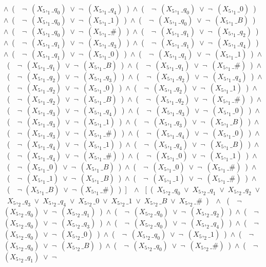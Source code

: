 ﻿\documentclass[a4paper,10pt]{article}
\begin{document}
$\wedge$\ (\ \ $\neg$\ $(X_5,_1\_q_0)$\ $\vee$\ $\neg$\ $(X_5,_1\_q_4)$\ )\ $\wedge$\ (\ \ $\neg$\ $(X_5,_1\_q_0)$\ $\vee$\ $\neg$\ $(X_5,_1\_0)$\ )\ $\wedge$\ (\ \ $\neg$\ $(X_5,_1\_q_0)$\ $\vee$\ $\neg$\ $(X_5,_1\_1)$\ )\ $\wedge$\ (\ \ $\neg$\ $(X_5,_1\_q_0)$\ $\vee$\ $\neg$\ $(X_5,_1\_B)$\ )\ $\wedge$\ (\ \ $\neg$\ $(X_5,_1\_q_0)$\ $\vee$\ $\neg$\ $(X_5,_1\_\#)$\ )\ $\wedge$\ (\ \ $\neg$\ $(X_5,_1\_q_1)$\ $\vee$\ $\neg$\ $(X_5,_1\_q_2)$\ )\ $\wedge$\ (\ \ $\neg$\ $(X_5,_1\_q_1)$\ $\vee$\ $\neg$\ $(X_5,_1\_q_3)$\ )\ $\wedge$\ (\ \ $\neg$\ $(X_5,_1\_q_1)$\ $\vee$\ $\neg$\ $(X_5,_1\_q_4)$\ )\ $\wedge$\ (\ \ $\neg$\ $(X_5,_1\_q_1)$\ $\vee$\ $\neg$\ $(X_5,_1\_0)$\ )\ $\wedge$\ (\ \ $\neg$\ $(X_5,_1\_q_1)$\ $\vee$\ $\neg$\ $(X_5,_1\_1)$\ )\ $\wedge$\ (\ \ $\neg$\ $(X_5,_1\_q_1)$\ $\vee$\ $\neg$\ $(X_5,_1\_B)$\ )\ $\wedge$\ (\ \ $\neg$\ $(X_5,_1\_q_1)$\ $\vee$\ $\neg$\ $(X_5,_1\_\#)$\ )\ $\wedge$\ (\ \ $\neg$\ $(X_5,_1\_q_2)$\ $\vee$\ $\neg$\ $(X_5,_1\_q_3)$\ )\ $\wedge$\ (\ \ $\neg$\ $(X_5,_1\_q_2)$\ $\vee$\ $\neg$\ $(X_5,_1\_q_4)$\ )\ $\wedge$\ (\ \ $\neg$\ $(X_5,_1\_q_2)$\ $\vee$\ $\neg$\ $(X_5,_1\_0)$\ )\ $\wedge$\ (\ \ $\neg$\ $(X_5,_1\_q_2)$\ $\vee$\ $\neg$\ $(X_5,_1\_1)$\ )\ $\wedge$\ (\ \ $\neg$\ $(X_5,_1\_q_2)$\ $\vee$\ $\neg$\ $(X_5,_1\_B)$\ )\ $\wedge$\ (\ \ $\neg$\ $(X_5,_1\_q_2)$\ $\vee$\ $\neg$\ $(X_5,_1\_\#)$\ )\ $\wedge$\ (\ \ $\neg$\ $(X_5,_1\_q_3)$\ $\vee$\ $\neg$\ $(X_5,_1\_q_4)$\ )\ $\wedge$\ (\ \ $\neg$\ $(X_5,_1\_q_3)$\ $\vee$\ $\neg$\ $(X_5,_1\_0)$\ )\ $\wedge$\ (\ \ $\neg$\ $(X_5,_1\_q_3)$\ $\vee$\ $\neg$\ $(X_5,_1\_1)$\ )\ $\wedge$\ (\ \ $\neg$\ $(X_5,_1\_q_3)$\ $\vee$\ $\neg$\ $(X_5,_1\_B)$\ )\ $\wedge$\ (\ \ $\neg$\ $(X_5,_1\_q_3)$\ $\vee$\ $\neg$\ $(X_5,_1\_\#)$\ )\ $\wedge$\ (\ \ $\neg$\ $(X_5,_1\_q_4)$\ $\vee$\ $\neg$\ $(X_5,_1\_0)$\ )\ $\wedge$\ (\ \ $\neg$\ $(X_5,_1\_q_4)$\ $\vee$\ $\neg$\ $(X_5,_1\_1)$\ )\ $\wedge$\ (\ \ $\neg$\ $(X_5,_1\_q_4)$\ $\vee$\ $\neg$\ $(X_5,_1\_B)$\ )\ $\wedge$\ (\ \ $\neg$\ $(X_5,_1\_q_4)$\ $\vee$\ $\neg$\ $(X_5,_1\_\#)$\ )\ $\wedge$\ (\ \ $\neg$\ $(X_5,_1\_0)$\ $\vee$\ $\neg$\ $(X_5,_1\_1)$\ )\ $\wedge$\ (\ \ $\neg$\ $(X_5,_1\_0)$\ $\vee$\ $\neg$\ $(X_5,_1\_B)$\ )\ $\wedge$\ (\ \ $\neg$\ $(X_5,_1\_0)$\ $\vee$\ $\neg$\ $(X_5,_1\_\#)$\ )\ $\wedge$\ (\ \ $\neg$\ $(X_5,_1\_1)$\ $\vee$\ $\neg$\ $(X_5,_1\_B)$\ )\ $\wedge$\ (\ \ $\neg$\ $(X_5,_1\_1)$\ $\vee$\ $\neg$\ $(X_5,_1\_\#)$\ )\ $\wedge$\ (\ \ $\neg$ $(X_5,_1\_B)$\ $\vee$\ $\neg$ $(X_5,_1\_\#)$\ )\ ]\ \ $\wedge$ \ [\ (\ $X_5,_2\_q_0$\ $\vee$\ $X_5,_2\_q_1$\ $\vee$\ $X_5,_2\_q_2$\ $\vee$\ $X_5,_2\_q_3$\ $\vee$\ $X_5,_2\_q_4$\ $\vee$\ $X_5,_2\_0$\ $\vee$\ $X_5,_2\_1$\ $\vee$\ $X_5,_2\_B$\ $\vee$\ $X_5,_2\_\#$\ )\ \ $\wedge$ \ (\ \ $\neg$\ $(X_5,_2\_q_0)$\ $\vee$\ $\neg$\ $(X_5,_2\_q_1)$\ )\ $\wedge$\ (\ \ $\neg$\ $(X_5,_2\_q_0)$\ $\vee$\ $\neg$\ $(X_5,_2\_q_2)$\ )\ $\wedge$\ (\ \ $\neg$\ $(X_5,_2\_q_0)$\ $\vee$\ $\neg$\ $(X_5,_2\_q_3)$\ )\ $\wedge$\ (\ \ $\neg$\ $(X_5,_2\_q_0)$\ $\vee$\ $\neg$\ $(X_5,_2\_q_4)$\ )\ $\wedge$\ (\ \ $\neg$\ $(X_5,_2\_q_0)$\ $\vee$\ $\neg$\ $(X_5,_2\_0)$\ )\ $\wedge$\ (\ \ $\neg$\ $(X_5,_2\_q_0)$\ $\vee$\ $\neg$\ $(X_5,_2\_1)$\ )\ $\wedge$\ (\ \ $\neg$\ $(X_5,_2\_q_0)$\ $\vee$\ $\neg$\ $(X_5,_2\_B)$\ )\ $\wedge$\ (\ \ $\neg$\ $(X_5,_2\_q_0)$\ $\vee$\ $\neg$\ $(X_5,_2\_\#)$\ )\ $\wedge$\ (\ \ $\neg$\ $(X_5,_2\_q_1)$\ $\vee$\ $\neg$\ 
\end{document}
